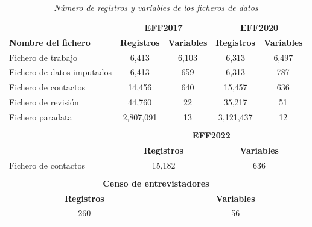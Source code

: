 \begin{table}[ht]
\centering{}
\begin{tabular}{lcccc}
\cline{2-5}
                            & \multicolumn{2}{c}{\textbf{EFF2017}}        & \multicolumn{2}{c}{\textbf{EFF2020}}        \\ \cline{2-5} 
\textbf{Nombre del fichero} & \textbf{Registros}   & \textbf{Variables}   & \textbf{Registros}   & \textbf{Variables}   \\ \hline
Fichero de trabajo          & 6,413                & 6,103                & 6,313                & 6,497                \\
Fichero de datos imputados  & 6,413                & 659                  & 6,313                & 787                  \\
Fichero de contactos        & 14,456               & 640                  & 15,457               & 636                  \\
Fichero de revisión      & 44,760               & 22                   & 35,217               & 51                   \\
Fichero paradata            & 2,807,091            & 13                   & 3,121,437            & 12                   \\ \hline
                            & \multicolumn{1}{l}{} & \multicolumn{1}{l}{} & \multicolumn{1}{l}{} & \multicolumn{1}{l}{} \\
                            & \multicolumn{4}{c}{\textbf{EFF2022}}                                                      \\ \cline{2-5} 
\textbf{}                   & \multicolumn{2}{c}{\textbf{Registros}}      & \multicolumn{2}{c}{\textbf{Variables}}      \\ \cline{2-5} 
Fichero de contactos        & \multicolumn{2}{c}{15,182}                  & \multicolumn{2}{c}{636}                     \\ \hline
                            & \multicolumn{1}{l}{} & \multicolumn{1}{l}{} & \multicolumn{1}{l}{} & \multicolumn{1}{l}{} \\
\multicolumn{5}{c}{\textbf{Censo de entrevistadores}}                                                                   \\ \hline
\multicolumn{2}{c}{\textbf{Registros}}             & \multicolumn{3}{c}{\textbf{Variables}}                             \\ \hline
\multicolumn{2}{c}{260}                            & \multicolumn{3}{c}{56}                                             \\ \hline
\end{tabular}
\caption{\textit{Número de registros y variables de los ficheros de datos}}
\label{table:registers}
\end{table}


